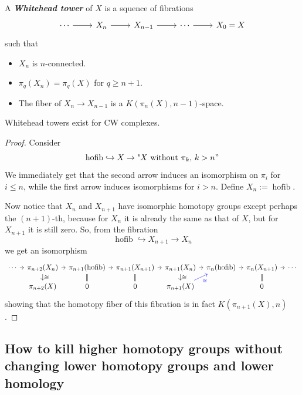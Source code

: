 \begin{defn}
	A \textit{\textbf{Whitehead tower}} of $X$ is a squence of fibrations
	\[\begin{tikzcd}
		\cdots \arrow[r]&X_{n}\arrow[r]&X_{n-1}\arrow[r]&\cdots \arrow[r]&X_{0}=X
	\end{tikzcd}\]
	such that
	\begin{itemize}
		\item $X_n$ is $n$-connected.
		\item $\pi_{q}(X_{n})=\pi_{q}(X)$ for $q\geq n+1$.
		\item The fiber of $X_n\to  X_{n-1}$ is a $K(\pi_{n}(X),n-1)$-space.
	\end{itemize}
\end{defn}
\begin{lemma}
	Whitehead towers exist for CW complexes.
\end{lemma}
\begin{proof}
	Consider
	\[\operatorname{hofib}\hookrightarrow X\to \text{"$X$ without $\pi_{k}$, $k>n$}"\]
	We immediately get that the second arrow induces an isomorphism on $\pi_{i}$ for $i\leq n$, while the first arrow induces isomorphisms for $i>n$. Define $ X_{n}:=\operatorname{hofib}$.

	Now notice that $X_n$ and $X_{n+1}$ have isomorphic homotopy groups except perhaps the $(n+1)$-th, because for $X_{n}$ it is already the same as that of $X$, but for $X_{n+1}$ it is still zero. So, from the fibration
	\[\operatorname{hofib} \hookrightarrow X_{n+1}\to X_{n}\]
	we get an isomorphism
	\[\begin{tikzcd}[column sep=tiny,row sep=small]
		\cdots\arrow[r]&\pi_{n+2}(X_{n})\arrow[r]\arrow[d,"\cong "]&\pi_{n+1}(\operatorname{hofib} )\arrow[d,equals]\arrow[r]&\pi_{n+1}(X_{n+1})\arrow[r]\arrow[d,equals]&\pi_{n+1}(X_{n})\arrow[r]\arrow[d,"\cong "]&\pi_{n}(\operatorname{hofib} )\arrow[r]&\pi_{n}(X_{n+1})\arrow[r]\arrow[d,equals]&\cdots\\
			       &\pi_{n+2}(X)&0&0&\pi_{n+1}(X)\arrow[ur,blue,"{\color{blue}\cong }",swap]&&0&
		\end{tikzcd}\]
	showing that the homotopy fiber of this fibration is in fact $K(\pi_{n+1}(X),n)$.
	
\end{proof}

\subsection*{How to kill higher homotopy groups without changing lower homotopy groups and lower homology}

